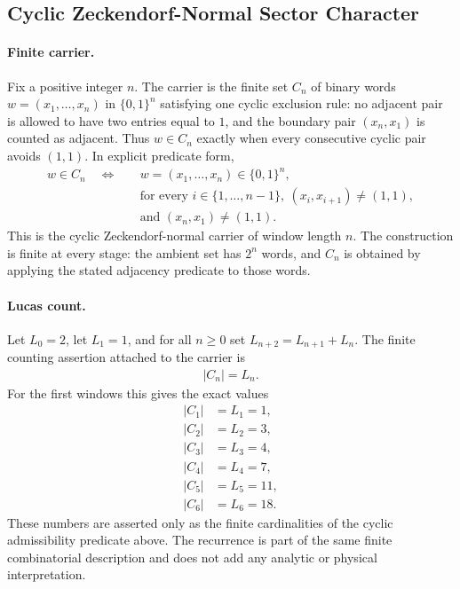 
\subsection{Cyclic Zeckendorf-Normal Sector Character}
\label{sec:zeckendorf-normal-cyclic-sector-character}

\paragraph{Finite carrier.}
Fix a positive integer $n$. The carrier is the finite set $C_n$ of binary words $w=(x_1,\ldots,x_n)$ in $\{0,1\}^n$ satisfying one cyclic exclusion rule: no adjacent pair is allowed to have two entries equal to $1$, and the boundary pair $(x_n,x_1)$ is counted as adjacent. Thus $w\in C_n$ exactly when every consecutive cyclic pair avoids $(1,1)$. In explicit predicate form,
$$
\begin{aligned}
w\in C_n
\quad\Longleftrightarrow\quad
& w=(x_1,\ldots,x_n)\in\{0,1\}^n,\\
& \text{for every } i\in\{1,\ldots,n-1\},\ (x_i,x_{i+1})\ne(1,1),\\
& \text{and } (x_n,x_1)\ne(1,1).
\end{aligned}
$$
This is the cyclic Zeckendorf-normal carrier of window length $n$. The construction is finite at every stage: the ambient set has $2^n$ words, and $C_n$ is obtained by applying the stated adjacency predicate to those words.

\paragraph{Lucas count.}
Let $L_0=2$, let $L_1=1$, and for all $n\geq 0$ set $L_{n+2}=L_{n+1}+L_n$. The finite counting assertion attached to the carrier is
$$
\begin{aligned}
|C_n|=L_n.
\end{aligned}
$$
For the first windows this gives the exact values
$$
\begin{aligned}
|C_1|&=L_1=1,\\
|C_2|&=L_2=3,\\
|C_3|&=L_3=4,\\
|C_4|&=L_4=7,\\
|C_5|&=L_5=11,\\
|C_6|&=L_6=18.
\end{aligned}
$$
These numbers are asserted only as the finite cardinalities of the cyclic admissibility predicate above. The recurrence is part of the same finite combinatorial description and does not add any analytic or physical interpretation.

